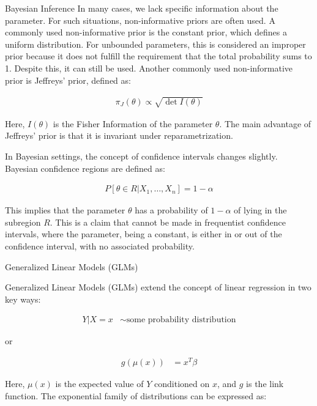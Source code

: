 \documentclass{beamer}
\begin{document}
\begin{columns}
\begin{column}{0.3\textwidth}
\begin{block}{Bayesian Inference}
In many cases, we lack specific information about the parameter. For such situations, non-informative priors are often used. A commonly used non-informative prior is the constant prior, which defines a uniform distribution. For unbounded parameters, this is considered an improper prior because it does not fulfill the requirement that the total probability sums to 1. Despite this, it can still be used. Another commonly used non-informative prior is Jeffreys' prior, defined as:

\begin{align*}
    \pi_J(\theta) \propto \sqrt{\det I(\theta)}
\end{align*}

Here, \(I(\theta)\) is the Fisher Information of the parameter \(\theta\). The main advantage of Jeffreys' prior is that it is invariant under reparametrization.

In Bayesian settings, the concept of confidence intervals changes slightly. Bayesian confidence regions are defined as:

\begin{align*}
    P[\theta \in R| X_1, \ldots, X_n] = 1 - \alpha
\end{align*}

This implies that the parameter \(\theta\) has a probability of \(1 - \alpha\) of lying in the subregion \(R\). This is a claim that cannot be made in frequentist confidence intervals, where the parameter, being a constant, is either in or out of the confidence interval, with no associated probability.

\end{block}

\begin{block}{Generalized Linear Models (GLMs)}

Generalized Linear Models (GLMs) extend the concept of linear regression in two key ways:

\begin{align*}
    Y | X = x &\sim \text{some probability distribution}  
\end{align*}

or 

\begin{align*}
    g(\mu(x)) &= x^T \beta
\end{align*}

Here, \(\mu(x)\) is the expected value of \(Y\) conditioned on \(x\), and \(g\) is the link function. The exponential family of distributions can be expressed as:


\end{block}
\end{column}
\end{columns}
\end{document}
